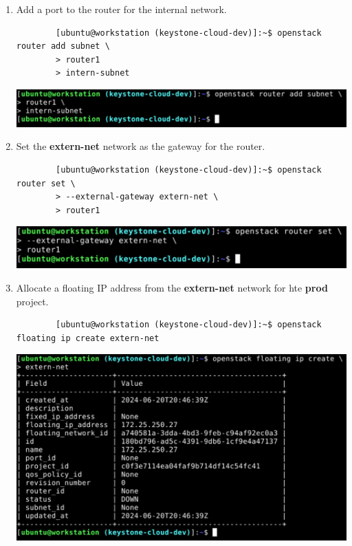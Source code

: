 \documentclass[letterpaper, 12pt]{article}
\begin{document}
\begin{enumerate}
    \item Add a port to the router for the internal network.
    \begin{lstlisting}
        [ubuntu@workstation (keystone-cloud-dev)]:~$ openstack router add subnet \
        > router1
        > intern-subnet
    \end{lstlisting}

    \begin{center}
        \includegraphics[width=\linewidth]{images/part1/step27.png}
    \end{center}

    \item Set the \textbf{extern-net} network as the gateway for the router.
    \begin{lstlisting}
        [ubuntu@workstation (keystone-cloud-dev)]:~$ openstack router set \
        > --external-gateway extern-net \
        > router1
    \end{lstlisting}

    \begin{center}
        \includegraphics[width=\linewidth]{images/part1/step28.png}
    \end{center}

    \item Allocate a floating IP address from the \textbf{extern-net} network for hte \textbf{prod} project.
    \begin{lstlisting}
        [ubuntu@workstation (keystone-cloud-dev)]:~$ openstack floating ip create extern-net
    \end{lstlisting}

    \begin{center}
        \includegraphics[width=\linewidth]{images/part1/step29.png}
    \end{center}


\end{enumerate}
\end{document}
